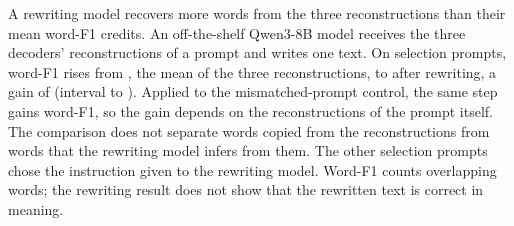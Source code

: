 A rewriting model recovers more words from the three reconstructions than their mean word-F1 credits.
An off-the-shelf Qwen3-8B model receives the three decoders' reconstructions of a prompt and writes one text.
On  selection prompts, word-F1 rises from , the mean of the three reconstructions, to  after rewriting, a gain of  (interval  to ). %
Applied to the mismatched-prompt control, the same step gains  word-F1, so the gain depends on the reconstructions of the prompt itself.
The comparison does not separate words copied from the reconstructions from words that the rewriting model infers from them. %
The other  selection prompts chose the instruction given to the rewriting model. %
Word-F1 counts overlapping words; the rewriting result does not show that the rewritten text is correct in meaning.
